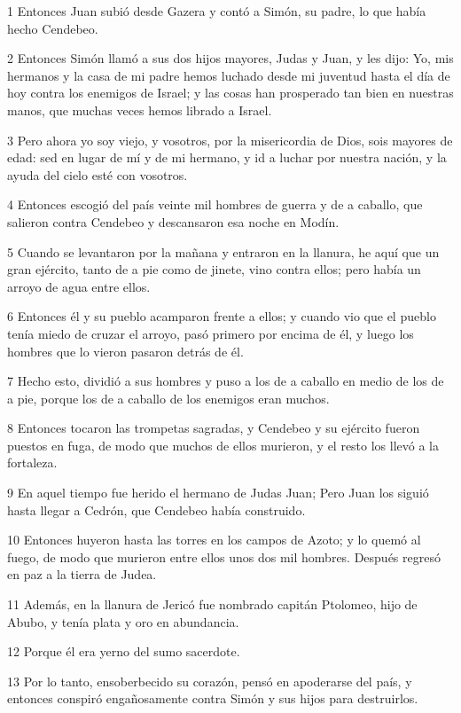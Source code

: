 \par 1 Entonces Juan subió desde Gazera y contó a Simón, su padre, lo que había hecho Cendebeo.
\par 2 Entonces Simón llamó a sus dos hijos mayores, Judas y Juan, y les dijo: Yo, mis hermanos y la casa de mi padre hemos luchado desde mi juventud hasta el día de hoy contra los enemigos de Israel; y las cosas han prosperado tan bien en nuestras manos, que muchas veces hemos librado a Israel.
\par 3 Pero ahora yo soy viejo, y vosotros, por la misericordia de Dios, sois mayores de edad: sed en lugar de mí y de mi hermano, y id a luchar por nuestra nación, y la ayuda del cielo esté con vosotros.
\par 4 Entonces escogió del país veinte mil hombres de guerra y de a caballo, que salieron contra Cendebeo y descansaron esa noche en Modín.
\par 5 Cuando se levantaron por la mañana y entraron en la llanura, he aquí que un gran ejército, tanto de a pie como de jinete, vino contra ellos; pero había un arroyo de agua entre ellos.
\par 6 Entonces él y su pueblo acamparon frente a ellos; y cuando vio que el pueblo tenía miedo de cruzar el arroyo, pasó primero por encima de él, y luego los hombres que lo vieron pasaron detrás de él.
\par 7 Hecho esto, dividió a sus hombres y puso a los de a caballo en medio de los de a pie, porque los de a caballo de los enemigos eran muchos.
\par 8 Entonces tocaron las trompetas sagradas, y Cendebeo y su ejército fueron puestos en fuga, de modo que muchos de ellos murieron, y el resto los llevó a la fortaleza.
\par 9 En aquel tiempo fue herido el hermano de Judas Juan; Pero Juan los siguió hasta llegar a Cedrón, que Cendebeo había construido.
\par 10 Entonces huyeron hasta las torres en los campos de Azoto; y lo quemó al fuego, de modo que murieron entre ellos unos dos mil hombres. Después regresó en paz a la tierra de Judea.
\par 11 Además, en la llanura de Jericó fue nombrado capitán Ptolomeo, hijo de Abubo, y tenía plata y oro en abundancia.
\par 12 Porque él era yerno del sumo sacerdote.
\par 13 Por lo tanto, ensoberbecido su corazón, pensó en apoderarse del país, y entonces conspiró engañosamente contra Simón y sus hijos para destruirlos.
